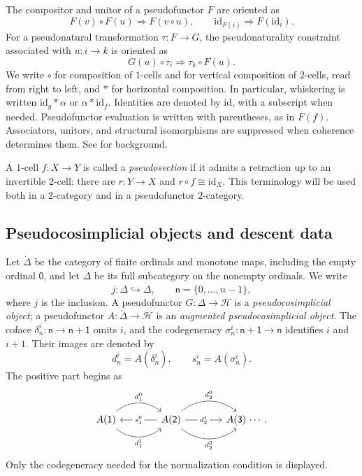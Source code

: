 \documentclass[11pt,a4paper]{article}
\numberwithin{equation}{section}
\theoremstyle{definition}
\theoremstyle{remark}
\newcommand{\id}{\mathrm{id}}
\newcommand{\Hcat}{\mathcal H}
\begin{document}
The compositor and unitor of a pseudofunctor $F$ are oriented as
\[
  F(v)\circ F(u)\Longrightarrow F(v\circ u),
  \qquad
  \id_{F(i)}\Longrightarrow F(\id_i).
\]
For a pseudonatural transformation $\tau\colon F\to G$, the
pseudonaturality constraint associated with $u\colon i\to k$ is
oriented as
\[
  G(u)\circ\tau_i\Longrightarrow\tau_k\circ F(u).
\]
We write $\circ$ for composition of $1$-cells and for vertical
composition of $2$-cells, read from right to left, and $\ast$ for
horizontal composition. In particular, whiskering is written
$\id_g\ast\alpha$ or $\alpha\ast\id_f$. Identities are denoted
by $\id$, with a subscript when needed. Pseudofunctor evaluation is
written with parentheses, as in $F(f)$. Associators, unitors, and
structural isomorphisms are
suppressed when coherence determines them. See
\cite{KellyStreet1974,Lack2010} for background.

A $1$-cell $f\colon X\to Y$ is called a \emph{pseudosection} if it
admits a retraction up to an invertible $2$-cell: there are
$r\colon Y\to X$ and $r\circ f\cong\id_X$. This terminology will be used both
in a $2$-category and in a pseudofunctor $2$-category.


\subsection{Pseudocosimplicial objects and descent data}

Let $\dot\Delta$ be the category of finite ordinals and monotone maps,
including the empty ordinal $\mathsf0$, and let $\Delta$ be its full
subcategory on the nonempty ordinals. We write
\begin{equation}
  j\colon\Delta\hookrightarrow\dot\Delta,
  \qquad
  \mathsf n=\{0,\ldots,n-1\},
  \label{eq:j-inclusion}
\end{equation}
where $j$ is the inclusion. A pseudofunctor
$G\colon\Delta\to\Hcat$ is a \emph{pseudocosimplicial object}; a
pseudofunctor $A\colon\dot\Delta\to\Hcat$ is an
\emph{augmented pseudocosimplicial object}. The coface
$\delta_n^i\colon\mathsf n\to\mathsf{n+1}$ omits $i$, and the
codegeneracy $\sigma_n^i\colon\mathsf{n+1}\to\mathsf n$ identifies
$i$ and $i+1$. Their images are denoted by
\[
  d_n^i=A(\delta_n^i),
  \qquad
  s_n^i=A(\sigma_n^i).
\]
The positive part begins as
\begin{equation}
\begin{tikzcd}[column sep=3.8em]
  A(\mathsf 1)
    \ar[r,bend left=40,"d_1^0"]
    \ar[r,bend right=40,"d_1^1"']
  & A(\mathsf 2)
    \ar[l,"s_1^0" description]
    \ar[r,bend left=40,"d_2^0"]
    \ar[r,"d_2^1" description]
    \ar[r,bend right=40,"d_2^2"']
  & A(\mathsf 3)\,\cdots .
\end{tikzcd}
\label{eq:positive-cosimplicial}
\end{equation}
Only the codegeneracy needed for the normalization condition is
displayed.
\end{document}
